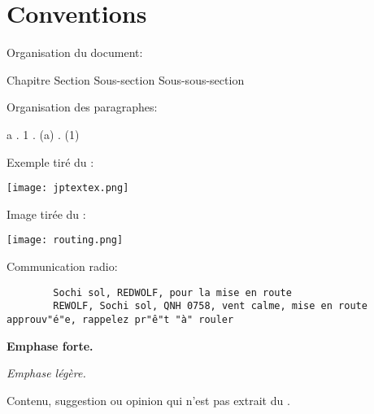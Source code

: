 \newpage

\thispagestyle{default}



\section*{Conventions}

\e
    \item Organisation du document:

    {\Large Chapitre} {\large Section} Sous-section {\small Sous-sous-section}

    \item Organisation des paragraphes:

    {\Large a} . {\large 1} . (a) . {\small (1)}

    \item Exemple tiré du \jp{}:

    \texttt{[image: jptextex.png]}

    \item Image tirée du \jp{}:

    \texttt{[image: routing.png]}

    \item Communication radio:
    \begin{lstlisting}
        Sochi sol, REDWOLF, pour la mise en route
        REWOLF, Sochi sol, QNH 0758, vent calme, mise en route approuv"é"e, rappelez pr"ê"t "à" rouler
    \end{lstlisting}

    \item \textbf{Emphase forte.}

    \item \emph{Emphase légère.}

    \item {}
    
    \item {}
    
    \item {}

    \item \begin{notebox}Contenu, suggestion ou opinion qui n'est pas extrait du \jp{}.\end{notebox}

\ed 
